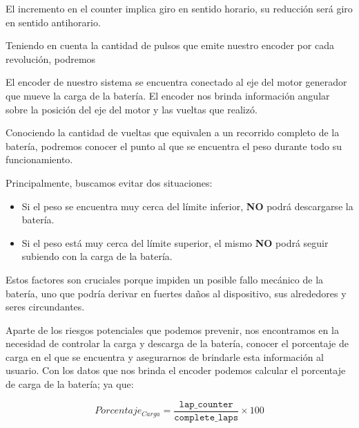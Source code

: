                     El incremento en el counter implica giro en sentido horario, su reducción será giro en sentido antihorario.\par
                    Teniendo en cuenta la cantidad de pulsos que emite nuestro encoder por cada revolución, podremos\par

                    El encoder de nuestro sistema se encuentra conectado al eje del motor generador que mueve la carga de la batería. El encoder nos brinda información angular sobre la posición del eje del motor y las vueltas que realizó.\par
                    Conociendo la cantidad de vueltas que equivalen a un recorrido completo de la batería, podremos conocer el punto al que se encuentra el peso durante todo su funcionamiento.\par
                    Principalmente, buscamos evitar dos situaciones:\par
                    
                    \begin{itemize} [label=•]
                \setlength{\itemindent}{1.5em}
                        \item Si el peso se encuentra muy cerca del límite inferior, \textbf{NO} podrá descargarse la batería.
                        \item Si el peso está muy cerca del límite superior, el mismo \textbf{NO} podrá seguir subiendo con la carga de la batería.\par
                    \end{itemize}
                    
                    Estos factores son cruciales porque impiden un posible fallo mecánico de la batería, uno que podría derivar en fuertes daños al dispositivo, sus alrededores y seres circundantes.\par
                    Aparte de los riesgos potenciales que podemos prevenir, nos encontramos en la necesidad de controlar la carga y descarga de la batería, conocer el porcentaje de carga en el que se encuentra y asegurarnos de brindarle esta información al usuario. Con los datos que nos brinda el encoder podemos calcular el porcentaje de carga de la batería; ya que:\par
                    \begin{equation}
                        Porcentaje_{Carga} = \frac{\texttt{lap\_counter}}{\texttt{complete\_laps}} \times 100
                    \end{equation}
                    
